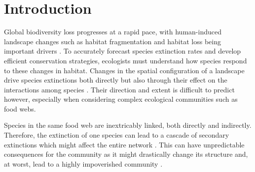 \documentclass[11pt]{article}
\begin{document}
\newpage
\begin{abstract}
  \noindent \normalsize We develop a novel approach to analyzing trophic metacommunities, which allows us to explore how progressive habitat loss affects food webs. Our method combines classic metapopulation models on fragmented landscapes with a Bayesian network representation of trophic interactions for calculating local extinction rates. This means we can repurpose known results from classic metapopulation theory for trophic metacommunities, such as ranking the habitat patches of the landscape with respect to their importance to the persistence of the metacommunity as a whole. We use this to study the effects of habitat loss, both on model communities and the plant-mammal Serengeti food web dataset as a case study. Combining straightforward parameterizability with computational efficiency, our method permits the analysis of species-rich food webs over large landscapes, with hundreds or even thousands of species and habitat patches, while still retaining much of the flexibility of explicit dynamical models.
\end{abstract}

\newpage


\section{Introduction} \label{sec:intro}

Global biodiversity loss progresses at a rapid pace, with human-induced landscape changes such as habitat fragmentation and habitat loss being important drivers \citep{Tylianakis2008, Haddad2015}. To accurately forecast species extinction rates and develop efficient conservation strategies, ecologists must understand how species respond to these changes in habitat. Changes in the spatial configuration of a landscape drive species extinctions both directly but also through their effect on the interactions among species \citep{Tylianakis2008, Valiente-Banuet2015}. Their direction and extent is difficult to predict however, especially when considering complex ecological communities such as food webs.

Species in the same food web are inextricably linked, both directly and indirectly. Therefore, the extinction of one species can lead to a cascade of secondary extinctions which might affect the entire network \citep{EbenmanJonsson2005, Dunne2009}. This can have unpredictable consequences for the community as it might drastically change its structure and, at worst, lead to a highly impoverished community \citep{EklofEbenman2006, Dunne2009}.
\end{document}
